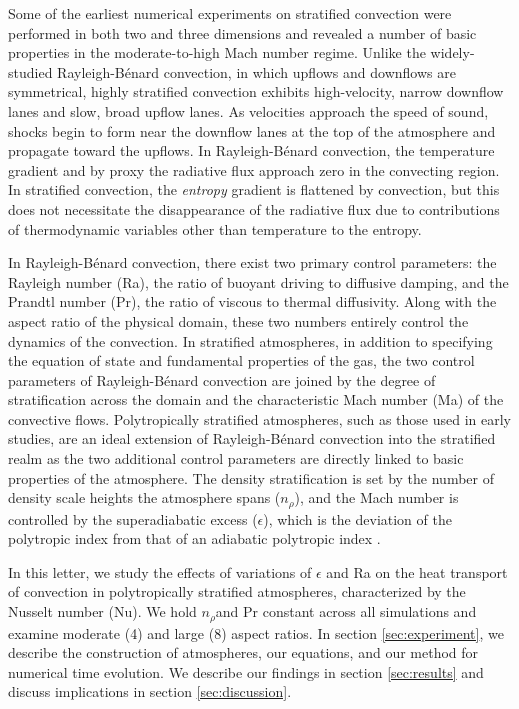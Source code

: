 \documentclass[aps, prl, twocolumn, groupedaddress, amsfonts, amssymb, amsmath]{revtex4-1}
\newcommand{\RB}{Rayleigh-B\'{e}nard }
\newcommand{\nrho}{\ensuremath{n_{\rho}}}
\begin{document}
Some of the earliest numerical experiments on stratified convection
were performed in both two \cite{graham1975, chan&all1982,
hurlburt&all1984, cattaneo&all1990} and three \cite{cattaneo&all1991, brummell&all1996} dimensions and
revealed a number of basic properties in the moderate-to-high Mach number regime.
Unlike the widely-studied \RB convection, in which upflows and downflows are symmetrical, highly stratified
convection exhibits high-velocity, narrow downflow lanes and slow, broad upflow lanes.  As velocities approach
the speed of sound, shocks begin to form near the downflow lanes at the top of the atmosphere and propagate toward the upflows.
In \RB convection, the temperature gradient
and by proxy the radiative flux approach zero in the convecting region.  In stratified convection, the 
\emph{entropy} gradient is flattened by convection, but this does not necessitate the disappearance of the
radiative flux due to contributions of thermodynamic variables other than temperature to the entropy.

In \RB convection, there exist two primary control parameters: the Rayleigh number (Ra), the ratio of
buoyant driving to diffusive damping, and the Prandtl number (Pr), the ratio of viscous to thermal
diffusivity.  Along with the aspect ratio of the physical domain, these two numbers entirely control the
dynamics of the convection.  In stratified atmospheres, in addition to specifying the equation of state and
fundamental properties of the gas, the two control parameters of \RB convection are joined by the degree of
stratification across the domain and the characteristic Mach number (Ma) of the convective flows.  
Polytropically stratified atmospheres, such as those used in early studies, are an ideal extension of
\RB convection into the stratified realm as the two additional control parameters are directly linked to
basic properties of the atmosphere.  The density stratification is set by the number of density scale heights
the atmosphere spans (\nrho), and the Mach number is controlled by the superadiabatic excess ($\epsilon$),
which is the deviation of the polytropic index from that of an adiabatic polytropic index \cite{graham1975}.

In this letter, we study the effects of variations of $\epsilon$ and Ra on the heat transport of convection
in polytropically stratified atmospheres, characterized by the Nusselt number (Nu).  We hold \nrho and Pr
constant across all simulations and examine moderate (4) and large (8) aspect ratios.  In section 
\ref{sec:experiment}, we describe the construction of atmospheres, our equations, and our method for
numerical time evolution.  We describe our findings in section \ref{sec:results} and discuss
implications in section \ref{sec:discussion}.
\end{document}
